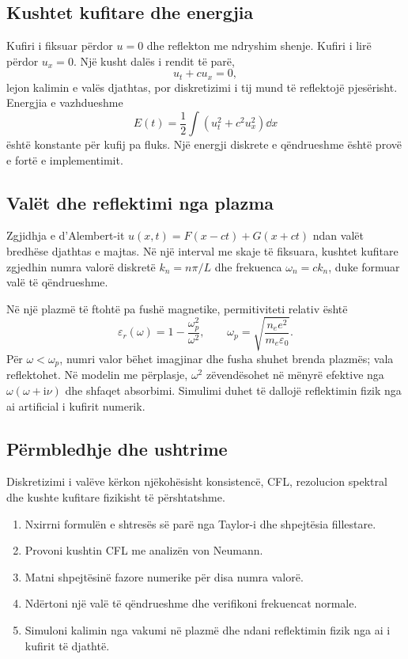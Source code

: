 \subsection{Kushtet kufitare dhe energjia}
Kufiri i fiksuar përdor $u=0$ dhe reflekton me ndryshim shenje. Kufiri i lirë përdor $u_x=0$. Një kusht dalës i rendit të parë,
\begin{equation}
 u_t+cu_x=0,
\end{equation}
lejon kalimin e valës djathtas, por diskretizimi i tij mund të reflektojë pjesërisht. Energjia e vazhdueshme
\begin{equation}
 E(t)=\frac12\int\left(u_t^2+c^2u_x^2\right)\dd x
\end{equation}
është konstante për kufij pa fluks. Një energji diskrete e qëndrueshme është provë e fortë e implementimit.

\subsection{Valët dhe reflektimi nga plazma}
Zgjidhja e d'Alembert-it $u(x,t)=F(x-ct)+G(x+ct)$ ndan valët bredhëse djathtas e majtas. Në një interval me skaje të fiksuara, kushtet kufitare zgjedhin numra valorë diskretë $k_n=n\pi/L$ dhe frekuenca $\omega_n=ck_n$, duke formuar valë të qëndrueshme.

Në një plazmë të ftohtë pa fushë magnetike, permitiviteti relativ është
\begin{equation}
 \varepsilon_r(\omega)=1-\frac{\omega_p^2}{\omega^2},\qquad
 \omega_p=\sqrt{\frac{n_ee^2}{m_e\varepsilon_0}}.
\end{equation}
Për $\omega<\omega_p$, numri valor bëhet imagjinar dhe fusha shuhet brenda plazmës; vala reflektohet. Në modelin me përplasje, $\omega^2$ zëvendësohet në mënyrë efektive nga $\omega(\omega+\mathrm{i}\nu)$ dhe shfaqet absorbimi. Simulimi duhet të dallojë reflektimin fizik nga ai artificial i kufirit numerik.

\subsection{Përmbledhje dhe ushtrime}
Diskretizimi i valëve kërkon njëkohësisht konsistencë, CFL, rezolucion spektral dhe kushte kufitare fizikisht të përshtatshme.
\begin{enumerate}
\item Nxirrni formulën e shtresës së parë nga Taylor-i dhe shpejtësia fillestare.
\item Provoni kushtin CFL me analizën von Neumann.
\item Matni shpejtësinë fazore numerike për disa numra valorë.
\item Ndërtoni një valë të qëndrueshme dhe verifikoni frekuencat normale.
\item Simuloni kalimin nga vakumi në plazmë dhe ndani reflektimin fizik nga ai i kufirit të djathtë.
\end{enumerate}
